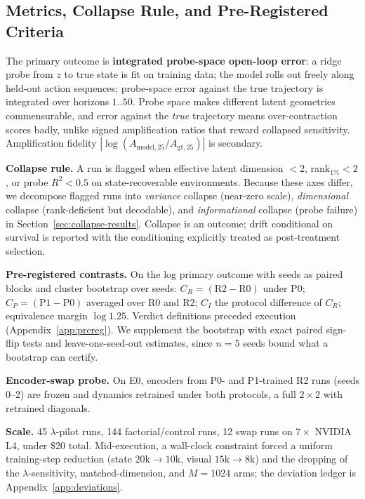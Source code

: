 \documentclass{article}
\begin{document}
\subsection{Metrics, Collapse Rule, and Pre-Registered Criteria}
\label{sec:metrics}

The primary outcome is \textbf{integrated probe-space open-loop error}: a ridge probe from $z$ to true state is fit on training data; the model rolls out freely along held-out action sequences; probe-space error against the true trajectory is integrated over horizons $1..50$. Probe space makes different latent geometries commensurable, and error against the \emph{true} trajectory means over-contraction scores badly, unlike signed amplification ratios that reward collapsed sensitivity. Amplification fidelity $|\log(A_{\text{model},25}/A_{\text{gt},25})|$ is secondary.

\textbf{Collapse rule.} A run is flagged when effective latent dimension $<2$, rank$_{1\%}<2$, or probe $R^2<0.5$ on state-recoverable environments. Because these axes differ, we decompose flagged runs into \emph{variance} collapse (near-zero scale), \emph{dimensional} collapse (rank-deficient but decodable), and \emph{informational} collapse (probe failure) in Section~\ref{sec:collapse-results}. Collapse is an outcome; drift conditional on survival is reported with the conditioning explicitly treated as post-treatment selection.

\textbf{Pre-registered contrasts.} On the log primary outcome with seeds as paired blocks and cluster bootstrap over seeds: $C_R=(\text{R2}-\text{R0})$ under P0; $C_P=(\text{P1}-\text{P0})$ averaged over R0 and R2; $C_I$ the protocol difference of $C_R$; equivalence margin $\log 1.25$. Verdict definitions preceded execution (Appendix~\ref{app:prereg}). We supplement the bootstrap with exact paired sign-flip tests and leave-one-seed-out estimates, since $n{=}5$ seeds bound what a bootstrap can certify.

\textbf{Encoder-swap probe.} On E0, encoders from P0- and P1-trained R2 runs (seeds 0--2) are frozen and dynamics retrained under both protocols, a full $2{\times}2$ with retrained diagonals.

\textbf{Scale.} 45 $\lambda$-pilot runs, 144 factorial/control runs, 12 swap runs on $7{\times}$ NVIDIA L4, under \$20 total. Mid-execution, a wall-clock constraint forced a uniform training-step reduction (state $20\text{k}{\to}10\text{k}$, visual $15\text{k}{\to}8\text{k}$) and the dropping of the $\lambda$-sensitivity, matched-dimension, and $M{=}1024$ arms; the deviation ledger is Appendix~\ref{app:deviations}.
\end{document}
